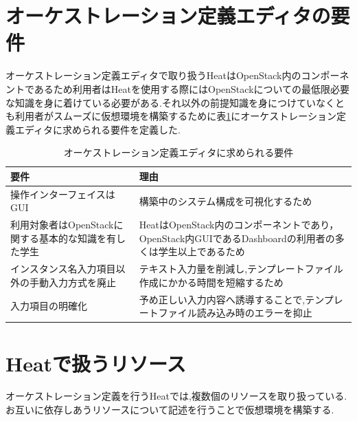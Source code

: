 \documentclass[mingoth]{kut-paper}		%
\begin{document}
	\section{オーケストレーション定義エディタの要件}
	オーケストレーション定義エディタで取り扱うHeatはOpenStack内のコンポーネントであるため利用者はHeatを使用する際にはOpenStackについての最低限必要な知識を身に着けている必要がある.それ以外の前提知識を身につけていなくとも利用者がスムーズに仮想環境を構築するために表\ref{table:3}にオーケストレーション定義エディタに求められる要件を定義した.
	\begin{table}[H]
		\begin{center}
			\caption{オーケストレーション定義エディタに求められる要件}
			\label{table:3}
			\begin{tabular}{|p{5cm}|p{7cm}|}\hline
				要件 & 理由\\ \hline \hline
				操作インターフェイスはGUI & 構築中のシステム構成を可視化するため\\ \hline
				利用対象者はOpenStackに関する基本的な知識を有した学生 & HeatはOpenStack内のコンポーネントであり，OpenStack内GUIであるDashboardの利用者の多くは学生以上であるため\\ \hline
				インスタンス名入力項目以外の手動入力方式を廃止 & テキスト入力量を削減し,テンプレートファイル作成にかかる時間を短縮するため\\ \hline
				入力項目の明確化 & 予め正しい入力内容へ誘導することで,テンプレートファイル読み込み時のエラーを抑止\\ \hline
			\end{tabular}
		\end{center}
	\end{table}
	\section{Heatで扱うリソース}
	オーケストレーション定義を行うHeatでは,複数個のリソースを取り扱っている.お互いに依存しあうリソースについて記述を行うことで仮想環境を構築する.
	
\end{document}
